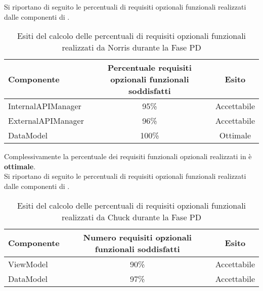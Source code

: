 				Si riportano di seguito le percentuali di requisiti opzionali funzionali realizzati dalle componenti di .
				\begin{table}[H]
					\centering
						\begin{tabu}{| l | c | c |}
							\hline
							Componente	& Percentuale requisiti opzionali funzionali soddisfatti	& Esito		\\ \hline \hline
							InternalAPIManager	& 95\% 	& Accettabile  \\ \hline
							ExternalAPIManager  & 	96\%	& Accettabile  \\ \hline
							DataModel  & 	100\%	& Ottimale  \\ \hline
						\end{tabu}
					\caption{Esiti del calcolo delle percentuali di requisiti opzionali funzionali realizzati da Norris durante la Fase PD}
				\end{table}
				Complessivamente la percentuale dei requisiti funzionali opzionali realizzati in  è \textbf{ottimale}.\\				
				Si riportano di seguito le percentuali di requisiti opzionali funzionali realizzati dalle componenti di \insglo{Chuck}.
				\begin{table}[H]
					\centering
						\begin{tabu}{| l | c | c |}
							\hline
							Componente	& Numero requisiti opzionali funzionali soddisfatti	& Esito		\\ \hline \hline
							ViewModel  	& 90\%	& Accettabile  \\ \hline
							DataModel  	& 	97\%	& Accettabile  \\ \hline
						\end{tabu}
					\caption{Esiti del calcolo delle percentuali di requisiti opzionali funzionali realizzati da Chuck durante la Fase PD}
				\end{table}

